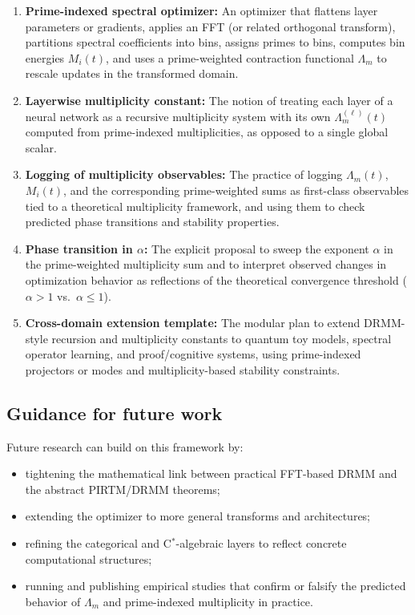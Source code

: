 \documentclass[11pt]{article}
\begin{document}
\begin{enumerate}[leftmargin=*]
  \item \textbf{Prime-indexed spectral optimizer:} An optimizer that flattens layer parameters or gradients, applies an FFT (or related orthogonal transform), partitions spectral coefficients into bins, assigns primes to bins, computes bin energies $M_i(t)$, and uses a prime-weighted contraction functional $\Lambda_m$ to rescale updates in the transformed domain.

  \item \textbf{Layerwise multiplicity constant:} The notion of treating each layer of a neural network as a recursive multiplicity system with its own $\Lambda_m^{(\ell)}(t)$ computed from prime-indexed multiplicities, as opposed to a single global scalar.

  \item \textbf{Logging of multiplicity observables:} The practice of logging $\Lambda_m(t)$, $M_i(t)$, and the corresponding prime-weighted sums as first-class observables tied to a theoretical multiplicity framework, and using them to check predicted phase transitions and stability properties.

  \item \textbf{Phase transition in $\alpha$:} The explicit proposal to sweep the exponent $\alpha$ in the prime-weighted multiplicity sum and to interpret observed changes in optimization behavior as reflections of the theoretical convergence threshold ($\alpha>1$ vs.\ $\alpha\le 1$).

  \item \textbf{Cross-domain extension template:} The modular plan to extend DRMM-style recursion and multiplicity constants to quantum toy models, spectral operator learning, and proof/cognitive systems, using prime-indexed projectors or modes and multiplicity-based stability constraints.
\end{enumerate}

\subsection{Guidance for future work}

Future research can build on this framework by:
\begin{itemize}[leftmargin=*]
  \item tightening the mathematical link between practical FFT-based DRMM and the abstract PIRTM/DRMM theorems;
  \item extending the optimizer to more general transforms and architectures;
  \item refining the categorical and C$^*$-algebraic layers to reflect concrete computational structures;
  \item running and publishing empirical studies that confirm or falsify the predicted behavior of $\Lambda_m$ and prime-indexed multiplicity in practice.
\end{itemize}
\end{document}
